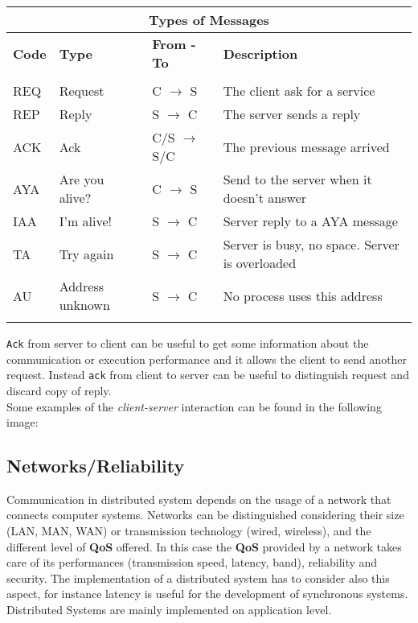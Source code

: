 \documentclass[11pt,a4paper]{article}
\begin{document}
\begin{table}[H]
\centering
\begin{tabular}{ |p{1cm}||p{3cm}|p{2cm}|p{6cm}|  }
	\hline
	\multicolumn{4}{|c|}{\textbf{Types of Messages}} \\
	\hline
	\textbf{Code} & \textbf{Type} & \textbf{From - To} & \textbf{Description}\\
	\hline
	&&&\\
	REQ& Request &C $\rightarrow$ S& The client ask for a service\\
	REP& Reply & S $\rightarrow$ C & The server sends a reply\\
	ACK& Ack & C/S $\rightarrow$ S/C & The previous message arrived\\
	AYA& Are you alive? & C $\rightarrow$ S & Send to the server when it doesn't answer\\
	IAA& I'm alive! & S $\rightarrow$ C & Server reply to a AYA message\\
	TA& Try again & S $\rightarrow$ C & Server is busy, no space. Server is overloaded\\
	AU& Address unknown & S $\rightarrow$ C & No process uses this address\\
	&&&\\
	\hline
\end{tabular}
\end{table}
\verb!Ack! from server to client can be useful to get some information about the communication or execution performance and it allows the client to send another request. Instead \verb!ack! from client to server can be useful to distinguish request and discard copy of reply.\\
Some examples of the \textit{client-server} interaction can be found in the following image: 

\subsection{Networks/Reliability}
Communication in distributed system depends on the usage of a network that connects computer systems. Networks can be distinguished considering their size (LAN, MAN, WAN) or transmission technology (wired, wireless), and the different level of \textbf{QoS} offered. In this case the \textbf{QoS} provided by a network takes care of its performances (transmission speed, latency, band), reliability and security. The implementation of a distributed system has to consider also this aspect, for instance latency is useful for the development of synchronous systems.
Distributed Systems are mainly implemented on application level.
\end{document}
